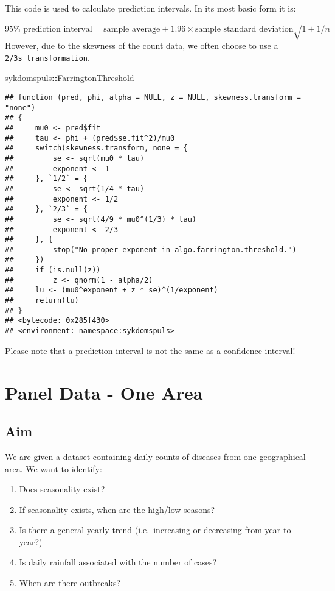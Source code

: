 \documentclass[]{book}
\newenvironment{Shaded}{\begin{snugshade}}{\end{snugshade}}
\newcommand{\OperatorTok}[1]{\textcolor[rgb]{0.81,0.36,0.00}{\textbf{#1}}}
\newcommand{\NormalTok}[1]{#1}
\providecommand{\tightlist}{%
  \setlength{\itemsep}{0pt}\setlength{\parskip}{0pt}}
\begin{document}
This code is used to calculate prediction intervals. In its most basic
form it is:

\[
95\% \text{ prediction interval} = \text{sample average} \pm 1.96 \times \text{sample standard deviation} \sqrt{ 1 + 1 / n}
\] However, due to the skewness of the count data, we often choose to
use a \texttt{2/3s\ transformation}.

\begin{Shaded}
\begin{Highlighting}[]
\NormalTok{sykdomspuls}\OperatorTok{::}\NormalTok{FarringtonThreshold}
\end{Highlighting}
\end{Shaded}

\begin{verbatim}
## function (pred, phi, alpha = NULL, z = NULL, skewness.transform = "none") 
## {
##     mu0 <- pred$fit
##     tau <- phi + (pred$se.fit^2)/mu0
##     switch(skewness.transform, none = {
##         se <- sqrt(mu0 * tau)
##         exponent <- 1
##     }, `1/2` = {
##         se <- sqrt(1/4 * tau)
##         exponent <- 1/2
##     }, `2/3` = {
##         se <- sqrt(4/9 * mu0^(1/3) * tau)
##         exponent <- 2/3
##     }, {
##         stop("No proper exponent in algo.farrington.threshold.")
##     })
##     if (is.null(z)) 
##         z <- qnorm(1 - alpha/2)
##     lu <- (mu0^exponent + z * se)^(1/exponent)
##     return(lu)
## }
## <bytecode: 0x285f430>
## <environment: namespace:sykdomspuls>
\end{verbatim}

Please note that a prediction interval is not the same as a confidence
interval!

\chapter{Panel Data - One Area}\label{panel-data---one-area}

\section{Aim}\label{aim}

We are given a dataset containing daily counts of diseases from one
geographical area. We want to identify:

\begin{enumerate}
\def\labelenumi{\arabic{enumi}.}
\tightlist
\item
  Does seasonality exist?
\item
  If seasonality exists, when are the high/low seasons?
\item
  Is there a general yearly trend (i.e.~increasing or decreasing from
  year to year?)
\item
  Is daily rainfall associated with the number of cases?
\item
  When are there outbreaks?
\end{enumerate}
\end{document}
